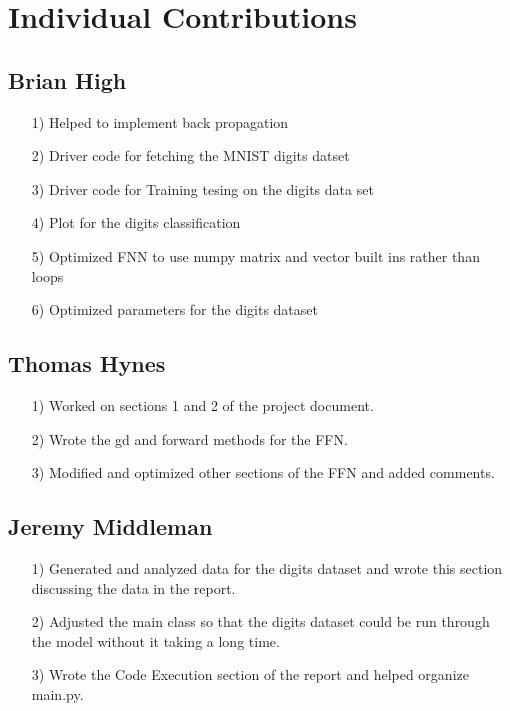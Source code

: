 \documentclass{article}
\begin{document}
\section{Individual Contributions}

\subsection{Brian High}
\begin{itemize}
    \item[1)] Helped to implement back propagation

\item[2)]Driver code for fetching the MNIST digits datset

\item[3)]Driver code for Training tesing on the digits data set

\item[4)]Plot for the digits classification 

\item[5)]Optimized FNN to use numpy matrix and vector built ins rather than loops

\item[6)]Optimized parameters for the digits dataset

\end{itemize}

\subsection{Thomas Hynes}
\begin{itemize}
    \item[1)] Worked on sections 1 and 2 of the project document.
    \item[2)] Wrote the gd and forward methods for the FFN.
    \item[3)] Modified and optimized other sections of the FFN and added comments.
\end{itemize}

\subsection{Jeremy Middleman}
\begin{itemize}
    \item[1)] Generated and analyzed data for the digits dataset and wrote this section discussing the data in the report.
    \item[2)] Adjusted the main class so that the digits dataset could be run through the model without it taking a long time.
    \item[3)] Wrote the Code Execution section of the report and helped organize main.py.
\end{itemize}
\end{document}
